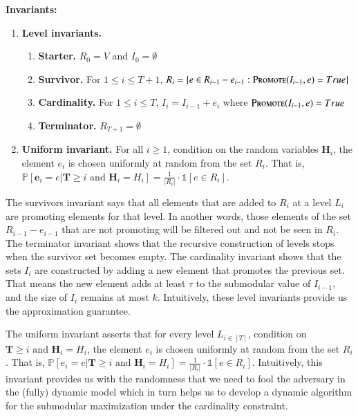 \documentclass[11pt]{article}
\renewcommand{\Pr}[1]{\ensuremath{\mathbb{P}\left[#1\right]}}
\newcommand{\ind}[1]{\ensuremath{\mathds{1}\left[#1\right]}}
\newcommand{\replacementTester}{\textsc{Promote}}
\newcommand{\bE}{\ensuremath{\mathbf{e}}}
\newcommand{\bT}{\ensuremath{\mathbf{T}}}
\newcommand{\bH}{\ensuremath{\mathbf{H}}}
\begin{document}
\begin{tcolorbox}[width=\linewidth, colback=white!80!gray,boxrule=0pt,frame hidden, sharp corners]
\textbf{Invariants:} 
\begin{enumerate}
    \item \textbf{Level invariants.} 
    \begin{enumerate}
        \item \textbf{Starter.} $R_0=V$ and $I_0 = \emptyset$
        \item \textbf{Survivor.}  For $1 \leq i \leq T + 1$, $R_i = \{ e \in R_{i-1} - e_{i-1}: \replacementTester{}(I_{i-1}, e) = True\}$ 
        \item  \textbf{Cardinality.} For $1 \leq i \leq T$, $I_i = I_{i-1} + e_i$ where $\replacementTester{}(I_{i-1}, e) = True$
        \item \textbf{Terminator.} $R_{T+1}=\emptyset$
    \end{enumerate}
    \item  \textbf{Uniform invariant.} For all $i \ge 1$, condition on the random variables $\bH_i$, the element $e_i$ is chosen uniformly at random from the set $R_i$. That is, $ \Pr{\bE_i = e |  \bT \geq i \text{ and } \bH_i = H_i  }= \frac{1}{|R_i|}\cdot \ind{e\in R_i}  $.
\end{enumerate}
\end{tcolorbox}



The survivors invariant says that all elements that are added to $R_i$ at a level $L_i$ 
are promoting elements for that level. 
In another words, those elements of the set $R_{i-1} - e_{i-1}$ 
that are not promoting will be filtered out and not be seen in $R_i$. 
The terminator invariant shows that the recursive construction of levels stops when the survivor set becomes empty. 
The cardinality invariant shows that the sets $I_i$ are constructed by adding a new element that promotes the previous set. That means the new element adds at least $\tau$ to the submodular value of $I_{i-1}$, and the size of $I_i$ remains at most $k$.
Intuitively, these level invariants provide us the approximation guarantee.



The uniform invariant asserts that for every level $L_{i \in [T]}$, 
condition on $\bT \geq i \text{ and } \bH_i = H_i $, 
the element $e_i$ is chosen uniformly at random from the set $R_i$. 
That is, $\Pr{e_i = e | \bT \geq i \text{ and } \bH_i = H_i } = \frac{1}{|R_i|} \cdot \ind{e \in R_i}$.
Intuitively, this invariant provides us with the randomness that we need  
to fool the adversary in the (fully) dynamic model 
which in turn helps us to develop a dynamic algorithm 
for the submodular maximization under the cardinality constraint. 
\end{document}
